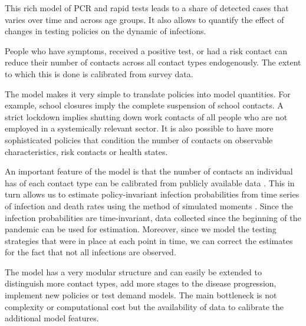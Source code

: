 This rich model of PCR and rapid tests leads to a share of detected cases that varies
over time and across age groups. It also allows to quantify the effect of changes in
testing policies on the dynamic of infections.

People who have symptoms, received a positive test, or had a risk contact can reduce
their number of contacts across all contact types endogenously. The extent to which this
is done is calibrated from survey data.

The model makes it very simple to translate policies into model quantities. For example,
school closures imply the complete suspension of school contacts. A strict lockdown
implies shutting down work contacts of all people who are not employed in a systemically
relevant sector. It is also possible to have more sophisticated policies that condition
the number of contacts on observable characteristics, risk contacts or health states.

An important feature of the model is that the number of contacts an individual has of
each contact type can be calibrated from publicly available data \citep{Mossong2008}.
This in turn allows us to estimate policy-invariant infection probabilities from time
series of infection and death rates using the method of simulated moments
\citep{McFadden1989}. Since the infection probabilities are time-invariant, data
collected since the beginning of the pandemic can be used for estimation. Moreover,
since we model the testing strategies that were in place at each point in time, we can
correct the estimates for the fact that not all infections are observed.

The model has a very modular structure and can easily be extended to distinguish more
contact types, add more stages to the disease progression, implement new policies
or test demand models. The main bottleneck is not complexity or computational cost
but the availability of data to calibrate the additional model features.
